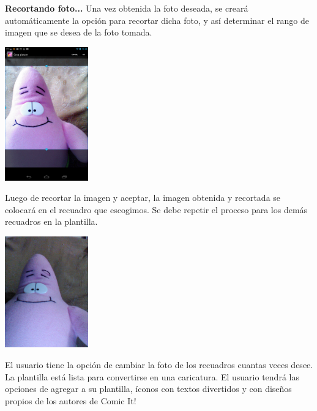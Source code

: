 \documentclass[12pt]{report}
\begin{document}
\begingroup
		\large{
			\textbf{
				Recortando foto...
				\newline
				\newline
			}
		}
	\endgroup
Una vez obtenida la foto deseada, se creará automáticamente la opción para recortar dicha foto, y así determinar el rango de imagen que se desea de la foto tomada.
\newline
\newline
\newline
	\begin{center}
		\begingroup
			\includegraphics[width=0.27\textwidth]{imagenes_usuario/crop.png}
		\endgroup
	\end{center}


Luego de recortar la imagen y aceptar, la imagen obtenida y recortada se colocará en el recuadro que escogimos. Se debe repetir el proceso para los demás recuadros en la plantilla.
\newline
	\begin{center}
		\begingroup
			\includegraphics[width=0.27\textwidth]{imagenes_usuario/foto.jpg}
		\endgroup
	\end{center}


El usuario tiene la opción de cambiar la foto de los recuadros cuantas veces desee.
La plantilla está lista para convertirse en una caricatura.
El usuario tendrá las opciones de agregar a su plantilla, íconos con textos divertidos  y con diseños propios de los autores de Comic It!
\newline
\newline
\end{document}
